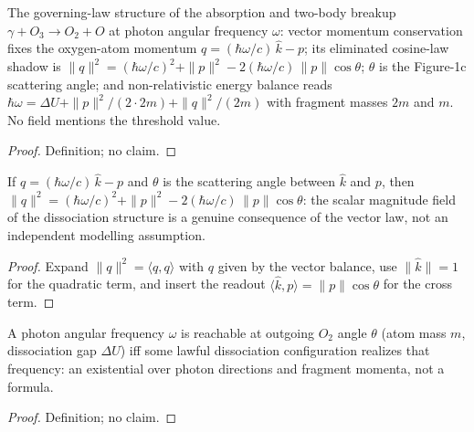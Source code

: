 \begin{definition}
\label{def:IPhO2026Problems_problem_IPhO_2026_1_C_1:IsTwoBodyDissociation}
The governing-law structure of the absorption and two-body breakup
$\gamma + O_3 \to O_2 + O$ at photon angular frequency $\omega$: vector
momentum conservation fixes the oxygen-atom momentum
$q = (\hbar\omega/c)\,\hat{k} - p$; its eliminated cosine-law shadow is
$\|q\|^2 = (\hbar\omega/c)^2 + \|p\|^2 - 2(\hbar\omega/c)\,\|p\|\cos\theta$;
$\theta$ is the Figure-1c scattering angle; and non-relativistic energy
balance reads $\hbar\omega = \Delta U + \|p\|^2/(2\cdot 2m) + \|q\|^2/(2m)$
with fragment masses $2m$ and $m$.  No field mentions the threshold value.
\end{definition}
\begin{proof}
Definition; no claim.
\end{proof}

\begin{lemma}
\label{lem:IPhO2026Problems_problem_IPhO_2026_1_C_1:momentum_q_sq_of_vector_balance}
If $q = (\hbar\omega/c)\,\hat{k} - p$ and $\theta$ is the scattering angle
between $\hat{k}$ and $p$, then
$\|q\|^2 = (\hbar\omega/c)^2 + \|p\|^2 - 2(\hbar\omega/c)\,\|p\|\cos\theta$:
the scalar magnitude field of the dissociation structure is a genuine
consequence of the vector law, not an independent modelling assumption.
\end{lemma}
\begin{proof}
Expand $\|q\|^2 = \langle q, q \rangle$ with $q$ given by the vector
balance, use $\|\hat{k}\| = 1$ for the quadratic term, and insert the
readout $\langle \hat{k}, p \rangle = \|p\|\cos\theta$ for the cross term.
\end{proof}

\begin{definition}
\label{def:IPhO2026Problems_problem_IPhO_2026_1_C_1:ReachableFrequency}
A photon angular frequency $\omega$ is reachable at outgoing $O_2$ angle
$\theta$ (atom mass $m$, dissociation gap $\Delta U$) iff some lawful
dissociation configuration realizes that frequency: an existential over
photon directions and fragment momenta, not a formula.
\end{definition}
\begin{proof}
Definition; no claim.
\end{proof}

